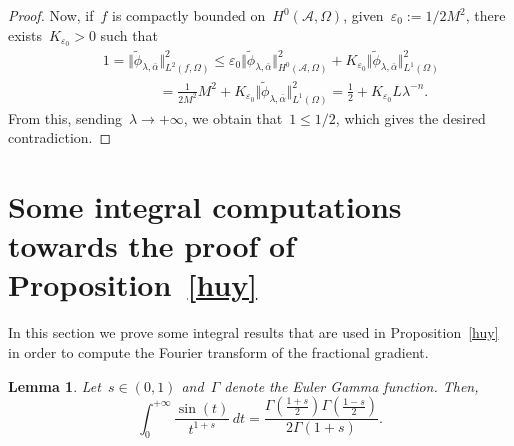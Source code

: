 \documentclass[11pt,hyp,]{nyjm}
\numberwithin{equation}{section}
\newtheorem{lemma}[theorem]{Lemma}
\theoremstyle{remark}
\renewcommand{\leq}{\leqslant}
\renewcommand{\epsilon}{\varepsilon}
\begin{document}
\begin{proof}
Now, if~$f$ is compactly bounded on~$H^0(\mathcal{A},\Omega)$, given~$\epsilon_0 :=1/{2 M^2}$, there exists~$K_{\epsilon_0}>0$ such that
\begin{eqnarray*}
&&1=\Vert \widetilde{\phi}_{\lambda, \bar{\alpha}} \Vert_{L^2(f,\Omega)}^2  \leq \epsilon_0 \Vert \widetilde{\phi}_{\lambda, \bar{\alpha}} \Vert^2_{H^0(\mathcal{A},\Omega)} + K_{\epsilon_0} \Vert \widetilde{\phi}_{\lambda, \bar{\alpha}} \Vert^2_{L^1(\Omega)} 
\\&&\qquad \qquad= \frac1{2 M^2} M^2 + K_{\epsilon_0} \Vert \widetilde{\phi}_{\lambda, \bar{\alpha}} \Vert^2_{L^1(\Omega)} 
=\frac{1}{2} + K_{\epsilon_0}L\lambda^{-n}.\end{eqnarray*}
{F}rom this, sending~$\lambda \to +\infty$, we obtain that~$1 \leq 1/2$, which 
gives the desired contradiction.
\end{proof}

\section{Some integral computations towards the proof of Proposition~\ref{huy}}\label{tappend}

In this section we prove some integral results that are used in Proposition~\ref{huy} in order to compute the Fourier transform of the fractional gradient.

\begin{lemma}\label{vcc}
Let~$s \in (0,1)$ and~$\Gamma$ denote the Euler Gamma function. Then,
\begin{equation}
\int_{0}^{+\infty} \frac{\sin(t)}{t^{1+s}}\, dt = \frac{\Gamma(\frac{1+s}{2})\Gamma(\frac{1-s}{2})}{2\Gamma(1+s)}.
\end{equation}
\end{lemma}
\end{document}
